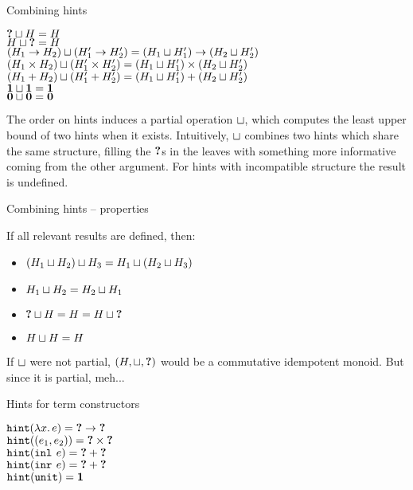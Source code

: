 \documentclass{beamer}
\begin{document}
\begin{frame}{Combining hints}

\begin{center}
  $\textbf{?} \sqcup H = H$ \\
  $H \sqcup \textbf{?} = H$ \\
  $(H_1 \to H_2) \sqcup (H'_1 \to H'_2) = (H_1 \sqcup H'_1) \to (H_2 \sqcup H'_2)$ \\
  $(H_1 \times H_2) \sqcup (H'_1 \times H'_2) = (H_1 \sqcup H'_1) \times (H_2 \sqcup H'_2)$ \\
  $(H_1 + H_2) \sqcup (H'_1 + H'_2) = (H_1 \sqcup H'_1) + (H_2 \sqcup H'_2)$ \\
  $\textbf{1} \sqcup \textbf{1} = \textbf{1}$ \\
  $\textbf{0} \sqcup \textbf{0} = \textbf{0}$
\end{center}

The order on hints induces a partial operation $\sqcup$, which computes the least upper bound of two hints when it exists. Intuitively, $\sqcup$ combines two hints which share the same structure, filling the $\textbf{?}$s in the leaves with something more informative coming from the other argument. For hints with incompatible structure the result is undefined.

\end{frame}

\begin{frame}{Combining hints -- properties}

If all relevant results are defined, then:

\begin{itemize}
  \item $(H_1 \sqcup H_2) \sqcup H_3 = H_1 \sqcup (H_2 \sqcup H_3)$
  \item $H_1 \sqcup H_2 = H_2 \sqcup H_1$
  \item $\textbf{?} \sqcup H = H = H \sqcup \textbf{?}$
  \item $H \sqcup H = H$
\end{itemize}

\vspace{2em}

If $\sqcup$ were not partial, $(H, \sqcup, \textbf{?})$ would be a commutative idempotent monoid. But since it is partial, meh...

\end{frame}

\begin{frame}{Hints for term constructors}

\begin{center}
  $\hintfor{\fun{x}{e}} = \Fun{\Hole}{\Hole}$ \\
  $\texttt{hint}((e_1, e_2)) = \textbf{?} \times \textbf{?}$ \\
  $\texttt{hint}(\texttt{inl}_{}\ e) = \textbf{?} + \textbf{?}$ \\
  $\texttt{hint}(\texttt{inr}_{}\ e) = \textbf{?} + \textbf{?}$ \\
  $\texttt{hint}(\texttt{unit}) = \textbf{1}$
\end{center}

\end{frame}
\end{document}
